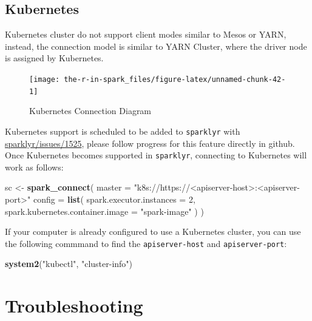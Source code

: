 \documentclass[]{book}
\newenvironment{Shaded}{\begin{snugshade}}{\end{snugshade}}
\newcommand{\DataTypeTok}[1]{\textcolor[rgb]{0.13,0.29,0.53}{#1}}
\newcommand{\DecValTok}[1]{\textcolor[rgb]{0.00,0.00,0.81}{#1}}
\newcommand{\KeywordTok}[1]{\textcolor[rgb]{0.13,0.29,0.53}{\textbf{#1}}}
\newcommand{\NormalTok}[1]{#1}
\newcommand{\StringTok}[1]{\textcolor[rgb]{0.31,0.60,0.02}{#1}}
\theoremstyle{definition}
\theoremstyle{definition}
\theoremstyle{definition}
\theoremstyle{remark}
\begin{document}
\hypertarget{kubernetes-1}{%
\subsection{Kubernetes}\label{kubernetes-1}}

Kubernetes cluster do not support client modes similar to Mesos or YARN,
instead, the connection model is similar to YARN Cluster, where the
driver node is assigned by Kubernetes.

\begin{figure}

{\centering \texttt{[image: the-r-in-spark\_files/figure-latex/unnamed-chunk-42-1]} 

}

\caption{Kubernetes Connection Diagram}\label{fig:unnamed-chunk-42}
\end{figure}

Kubernetes support is scheduled to be added to \texttt{sparklyr} with
\href{https://github.com/rstudio/sparklyr/issues/1525}{sparklyr/issues/1525},
please follow progress for this feature directly in github. Once
Kubernetes becomes supported in \texttt{sparklyr}, connecting to
Kubernetes will work as follows:

\begin{Shaded}
\begin{Highlighting}[]
\NormalTok{sc <-}\StringTok{ }\KeywordTok{spark_connect}\NormalTok{(}
  \DataTypeTok{master =} \StringTok{"k8s://https://<apiserver-host>:<apiserver-port>"}
  \DataTypeTok{config =} \KeywordTok{list}\NormalTok{(}
    \DataTypeTok{spark.executor.instances =} \DecValTok{2}\NormalTok{,}
    \DataTypeTok{spark.kubernetes.container.image =} \StringTok{"spark-image"}
\NormalTok{  )}
\NormalTok{)}
\end{Highlighting}
\end{Shaded}

If your computer is already configured to use a Kubernetes cluster, you
can use the following commmand to find the \texttt{apiserver-host} and
\texttt{apiserver-port}:

\begin{Shaded}
\begin{Highlighting}[]
\KeywordTok{system2}\NormalTok{(}\StringTok{"kubectl"}\NormalTok{, }\StringTok{"cluster-info"}\NormalTok{)}
\end{Highlighting}
\end{Shaded}

\hypertarget{troubleshooting}{%
\section{Troubleshooting}\label{troubleshooting}}
\end{document}
